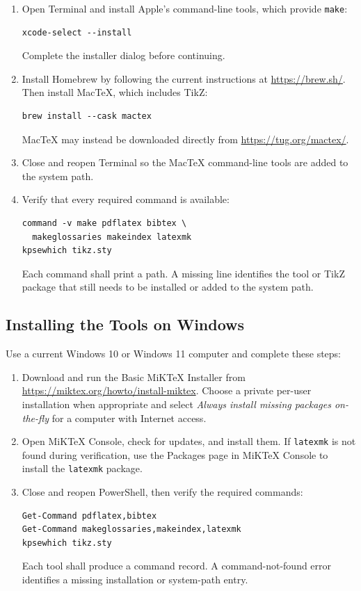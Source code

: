 \begin{enumerate}
  \item Open Terminal and install Apple's command-line tools, which provide \texttt{make}:
\begin{verbatim}
xcode-select --install
\end{verbatim}
  Complete the installer dialog before continuing.

  \item Install Homebrew by following the current instructions at \url{https://brew.sh/}. Then install MacTeX, which includes TikZ:
\begin{verbatim}
brew install --cask mactex
\end{verbatim}
  MacTeX may instead be downloaded directly from \url{https://tug.org/mactex/}.

  \item Close and reopen Terminal so the MacTeX command-line tools are added to the system path.

  \item Verify that every required command is available:
\begin{verbatim}
command -v make pdflatex bibtex \
  makeglossaries makeindex latexmk
kpsewhich tikz.sty
\end{verbatim}
  Each command shall print a path. A missing line identifies the tool or TikZ
  package that still needs to be installed or added to the system path.
\end{enumerate}

\subsection{Installing the Tools on Windows}

Use a current Windows 10 or Windows 11 computer and complete these steps:

\begin{enumerate}
  \item Download and run the Basic MiKTeX Installer from \url{https://miktex.org/howto/install-miktex}. Choose a private per-user installation when appropriate and select \emph{Always install missing packages on-the-fly} for a computer with Internet access.

  \item Open MiKTeX Console, check for updates, and install them. If \texttt{latexmk} is not found during verification, use the Packages page in MiKTeX Console to install the \texttt{latexmk} package.

  \item Close and reopen PowerShell, then verify the required commands:
\begin{verbatim}
Get-Command pdflatex,bibtex
Get-Command makeglossaries,makeindex,latexmk
kpsewhich tikz.sty
\end{verbatim}
  Each tool shall produce a command record. A command-not-found error identifies a missing installation or system-path entry.
\end{enumerate}

